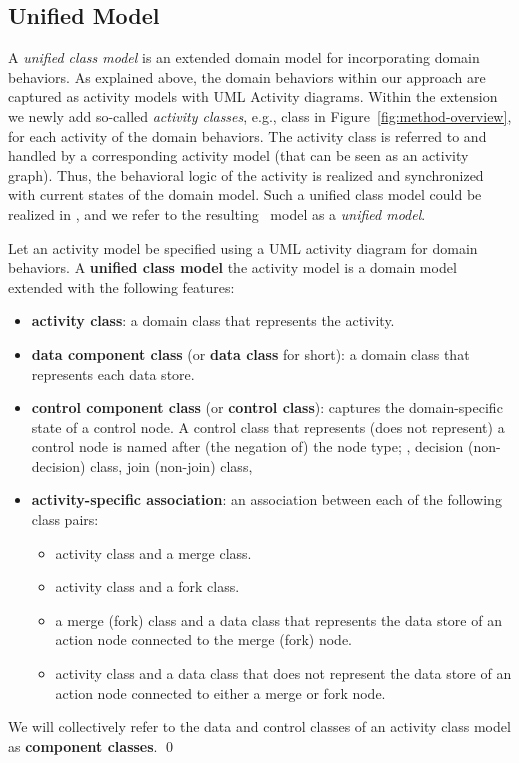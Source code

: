 \subsection{Unified Model}
\label{subsect:unifiedModel}

A \textit{unified class model} is an extended domain model for incorporating domain behaviors. As explained above, the domain behaviors within our approach are captured as activity models with UML Activity diagrams. Within the extension we newly add so-called \textit{activity classes}, e.g., class  in Figure~\ref{fig:method-overview}, for each activity of the domain behaviors. The activity class is referred to and handled by a corresponding activity model (that can be seen as an activity graph). Thus, the behavioral logic of the activity is realized and synchronized with current states of the domain model. Such a unified class model could be realized in \dcsl, and we refer to the resulting \dcsl~model as a \textit{unified model}.

\begin{definition} \label{def:unified-class-model}
	Let an activity model be specified using a UML activity diagram for domain behaviors. A \textbf{unified class model} \wrt the activity model is a domain model extended with the following features:
	
	\begin{itemize}%
		\item \textbf{activity class}: a domain class that represents the activity.
		\item \textbf{data component class} (or \textbf{data class} for short): a domain class that represents each data store.
		\item \textbf{control component class} (or \textbf{control class}): captures the domain-specific state of a control node. A control class that represents (does not represent) a control node is named after (the negation of) the node type; \eg, decision (non-decision) class, join (non-join) class, \etc
		\item \textbf{activity-specific association}: an association between each of the following class pairs:
		\begin{itemize}
			\item activity class and a merge class.
			\item activity class and a fork class.
			\item a merge (fork) class and a data class that represents the data store of an action node connected to the merge (fork) node.
			\item activity class and a data class that does not represent the data store of an action node connected to either a merge or fork node.
		\end{itemize}        	
	\end{itemize}
	We will collectively refer to the data and control classes of an activity class model as \textbf{component classes}. \qed
\end{definition}

